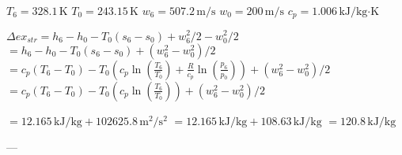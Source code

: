 \( T_6 = 328.1 \, \text{K} \)  
\( T_0 = 243.15 \, \text{K} \)  
\( w_6 = 507.2 \, \text{m/s} \)  
\( w_0 = 200 \, \text{m/s} \)  
\( c_p = 1.006 \, \text{kJ/kg·K} \)  

\( \Delta ex_{str} = h_6 - h_0 - T_0 (s_6 - s_0) + w_6^2 / 2 - w_0^2 / 2 \)  
\( = h_6 - h_0 - T_0 (s_6 - s_0) + (w_6^2 - w_0^2) / 2 \)  
\( = c_p (T_6 - T_0) - T_0 (c_p \ln \left( \frac{T_6}{T_0} \right) + \frac{R}{c_p} \ln \left( \frac{p_6}{p_0} \right)) + (w_6^2 - w_0^2) / 2 \)  
\( = c_p (T_6 - T_0) - T_0 (c_p \ln \left( \frac{T_6}{T_0} \right)) + (w_6^2 - w_0^2) / 2 \)  

\( = 12.165 \, \text{kJ/kg} + 102625.8 \, \text{m}^2/\text{s}^2 \)  
\( = 12.165 \, \text{kJ/kg} + 108.63 \, \text{kJ/kg} \)  
\( = 120.8 \, \text{kJ/kg} \)  

---